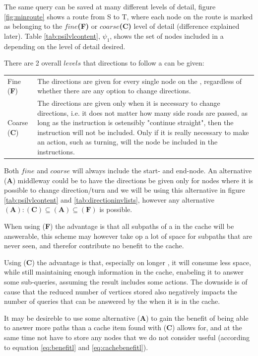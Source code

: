 The same query can be saved at many different levels of detail, figure \ref{fig:minroute} shows a route from S to T, where each node on the route is marked as belonging to the $fine$\textbf{(F)} or $coarse$\textbf{(C)} level of detail (difference explained later). Table \ref{tab:psilvlcontent}, $\psi_1$, shows the set of nodes included in a \spath depending on the level of detail desired. 


There are 2 overall $levels$ that directions to follow a \spath can be given:

\begin{tabular}{@{}l@{  } p{21em} }
Fine ({\bf F})		& The directions are given for every single node on the \spathns, regardless of whether there are any option to change directions. \\
Coarse ({\bf C})	& The directions are given only when it is necessary to change directions, i.e. it does not matter how many side roads are passed, as long as the instruction is ostensibly "continue straight", then the instruction will not be included. Only if it is really necessary to make an action, such as turning, will the node be included in the instructions.
\end{tabular}

Both $fine$ and $coarse$ will always include the start- and end-node. An alternative (\textbf{A}) middleway could be to have the directions be given only for nodes where it is possible to change direction/turn and we will be using this alternative in figure \ref{tab:psilvlcontent} and \ref{tab:directioninvlists}, however any alternative $(\textbf{A}):(\textbf{C}) \subseteq (\textbf{A}) \subseteq (\textbf{F})$ is possible. 

When using (\textbf{F}) the advantage is that all subpaths of a \spath in the cache will be answerable, this scheme may however take op a lot of space for subpaths that are never seen, and therefor contribute no benefit to the cache.

Using (\textbf{C}) the advantage is that, especially on longer \spathsns, it will consume less space, while still maintaining enough information in the cache, enabeling it to answer some sub-queries, assuming the result includes some actions. The downside is of cause that the reduced number of vertices stored also negatively impacts the number of queries that can be answered by the \spath when it is in the cache.

It may be desireble to use some alternative (\textbf{A}) to gain the benefit of being able to answer more paths than a cache item found with (\textbf{C}) allows for, and at the same time not have to store any nodes that we do not consider useful (according to equation \ref{eq:benefitl} and \ref{eq:cachebenefitl}).


